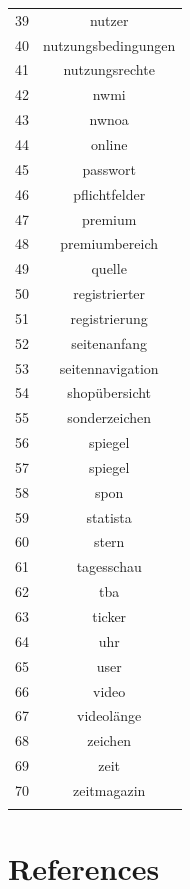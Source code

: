 \documentclass[
  12pt,
]{article}
\begin{document}
\begin{table}[!htbp]
\begin{tabular}{@{\extracolsep{5pt}} cc}
39 & nutzer \\ 
40 & nutzungsbedingungen \\ 
41 & nutzungsrechte \\ 
42 & nwmi \\ 
43 & nwnoa \\ 
44 & online \\ 
45 & passwort \\ 
46 & pflichtfelder \\ 
47 & premium \\ 
48 & premiumbereich \\ 
49 & quelle \\ 
50 & registrierter \\ 
51 & registrierung \\ 
52 & seitenanfang \\ 
53 & seitennavigation \\ 
54 & shopübersicht \\ 
55 & sonderzeichen \\ 
56 & spiegel \\ 
57 & spiegel \\ 
58 & spon \\ 
59 & statista \\ 
60 & stern \\ 
61 & tagesschau \\ 
62 & tba \\ 
63 & ticker \\ 
64 & uhr \\ 
65 & user \\ 
66 & video \\ 
67 & videolänge \\ 
68 & zeichen \\ 
69 & zeit \\ 
70 & zeitmagazin \\ 
\hline \\[-1.8ex] 
\end{tabular} 
\end{table}

\newpage

\hypertarget{references}{%
\section*{References}\label{references}}
\end{document}
